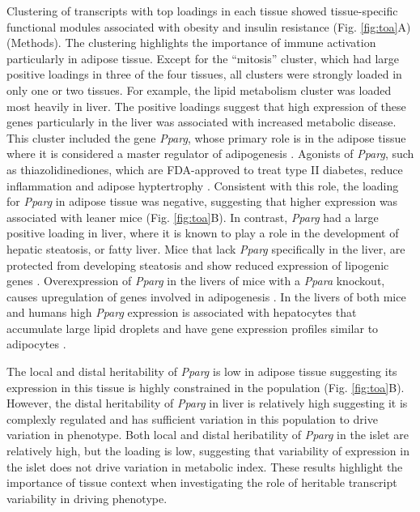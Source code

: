 \documentclass[
]{article}
\begin{document}
Clustering of transcripts with top loadings in each tissue showed
tissue-specific functional modules associated with obesity and insulin
resistance (Fig. \ref{fig:toa}A) (Methods). The clustering highlights
the importance of immune activation particularly in adipose tissue.
Except for the ``mitosis'' cluster, which had large positive loadings in
three of the four tissues, all clusters were strongly loaded in only one
or two tissues. For example, the lipid metabolism cluster was loaded
most heavily in liver. The positive loadings suggest that high
expression of these genes particularly in the liver was associated with
increased metabolic disease. This cluster included the gene
\textit{Pparg}, whose primary role is in the adipose tissue where it is
considered a master regulator of adipogenesis \cite{pmid17389767}.
Agonists of \textit{Pparg}, such as thiazolidinediones, which are
FDA-approved to treat type II diabetes, reduce inflammation and adipose
hyptertrophy \cite{pmid17389767}. Consistent with this role, the loading
for \textit{Pparg} in adipose tissue was negative, suggesting that
higher expression was associated with leaner mice (Fig. \ref{fig:toa}B).
In contrast, \textit{Pparg} had a large positive loading in liver, where
it is known to play a role in the development of hepatic steatosis, or
fatty liver. Mice that lack \textit{Pparg} specifically in the liver,
are protected from developing steatosis and show reduced expression of
lipogenic genes \cite{pmid12805374, pmid12618528}. Overexpression of
\textit{Pparg} in the livers of mice with a \textit{Ppara} knockout,
causes upregulation of genes involved in adipogenesis
\cite{pmid16357043}. In the livers of both mice and humans high
\textit{Pparg} expression is associated with hepatocytes that accumulate
large lipid droplets and have gene expression profiles similar to
adipocytes \cite{pmid15644454, pmid16403437}.

The local and distal heritability of \textit{Pparg} is low in adipose
tissue suggesting its expression in this tissue is highly constrained in
the population (Fig. \ref{fig:toa}B). However, the distal heritability
of \textit{Pparg} in liver is relatively high suggesting it is complexly
regulated and has sufficient variation in this population to drive
variation in phenotype. Both local and distal heribatility of
\textit{Pparg} in the islet are relatively high, but the loading is low,
suggesting that variability of expression in the islet does not drive
variation in metabolic index. These results highlight the importance of
tissue context when investigating the role of heritable transcript
variability in driving phenotype.
\end{document}
